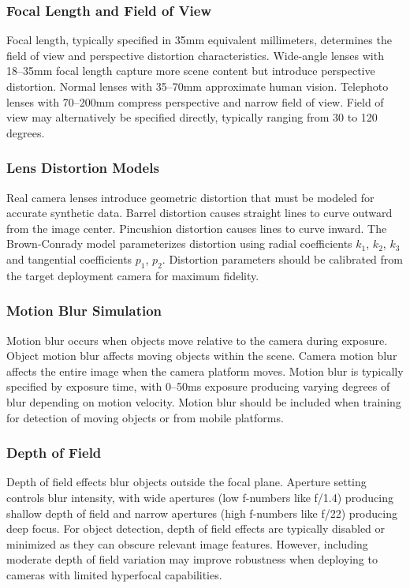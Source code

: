 \subsubsection{Focal Length and Field of View}

Focal length, typically specified in 35mm equivalent millimeters, determines the field of view and perspective distortion characteristics. Wide-angle lenses with 18--35mm focal length capture more scene content but introduce perspective distortion. Normal lenses with 35--70mm approximate human vision. Telephoto lenses with 70--200mm compress perspective and narrow field of view. Field of view may alternatively be specified directly, typically ranging from 30 to 120 degrees.

\subsubsection{Lens Distortion Models}

Real camera lenses introduce geometric distortion that must be modeled for accurate synthetic data. Barrel distortion causes straight lines to curve outward from the image center. Pincushion distortion causes lines to curve inward. The Brown-Conrady model parameterizes distortion using radial coefficients $k_1$, $k_2$, $k_3$ and tangential coefficients $p_1$, $p_2$. Distortion parameters should be calibrated from the target deployment camera for maximum fidelity.

\subsubsection{Motion Blur Simulation}

Motion blur occurs when objects move relative to the camera during exposure. Object motion blur affects moving objects within the scene. Camera motion blur affects the entire image when the camera platform moves. Motion blur is typically specified by exposure time, with 0--50ms exposure producing varying degrees of blur depending on motion velocity. Motion blur should be included when training for detection of moving objects or from mobile platforms.

\subsubsection{Depth of Field}

Depth of field effects blur objects outside the focal plane. Aperture setting controls blur intensity, with wide apertures (low f-numbers like f/1.4) producing shallow depth of field and narrow apertures (high f-numbers like f/22) producing deep focus. For object detection, depth of field effects are typically disabled or minimized as they can obscure relevant image features. However, including moderate depth of field variation may improve robustness when deploying to cameras with limited hyperfocal capabilities.

